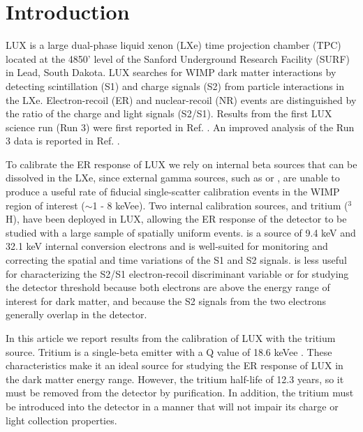 \section{Introduction}

LUX is a large dual-phase liquid xenon (LXe) time projection chamber (TPC) located at the 4850' level of the Sanford Underground Research Facility (SURF) in Lead, South Dakota. LUX searches for WIMP dark matter interactions by detecting scintillation (S1) and charge signals (S2) from particle interactions in the LXe. Electron-recoil (ER) and nuclear-recoil (NR) events are distinguished by the ratio of the charge and light signals (S2/S1). Results from the first LUX science run (Run 3) were first reported in Ref. \cite{LUX_PRL}. An improved analysis of the Run 3 data is reported in Ref. \cite{lux-reanalysis}.


To calibrate the ER response of LUX we rely on internal beta sources that can be dissolved in the LXe, since external gamma sources, such as \cssrc or \thsrc, are unable to produce a useful rate of fiducial single-scatter calibration events in the WIMP region of interest ($\sim$1 - 8 keVee). Two internal calibration sources,  \krsrc\cite{Kastens:2009rt, baudis} and tritium ($^{3}$H), have been deployed in LUX, allowing the ER response of the detector to be studied with a large sample of spatially uniform events. \krsrc is a source of 9.4 keV and 32.1 keV internal conversion electrons and is well-suited for monitoring and correcting the spatial and time variations of the S1 and S2 signals. \krsrc is less useful for characterizing the S2/S1 electron-recoil discriminant variable or for studying the detector threshold because both \krsrc electrons are above the energy range of interest for dark matter, and because the S2 signals from the two electrons generally overlap in the detector.

In this article we report results from the calibration of LUX with the tritium source. Tritium is a single-beta emitter with a Q value of 18.6 keVee \cite{Tritium_Q}.  These characteristics make it an ideal source for studying the ER response of LUX in the dark matter energy range. However, the tritium half-life of 12.3 years\cite{Tritium_halflife_all}, so it must be removed from the detector by purification. In addition, the tritium must be introduced into the detector in a manner that will not impair its charge or light collection properties.

